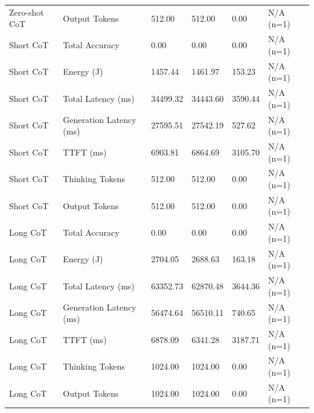 \begin{table}
\begin{tabular}{llllll}
Zero-shot CoT & Output Tokens & 512.00 & 512.00 & 0.00 & N/A (n=1) \\
Short CoT & Total Accuracy & 0.00 & 0.00 & 0.00 & N/A (n=1) \\
Short CoT & Energy (J) & 1457.44 & 1461.97 & 153.23 & N/A (n=1) \\
Short CoT & Total Latency (ms) & 34499.32 & 34443.60 & 3590.44 & N/A (n=1) \\
Short CoT & Generation Latency (ms) & 27595.51 & 27542.19 & 527.62 & N/A (n=1) \\
Short CoT & TTFT (ms) & 6903.81 & 6864.69 & 3105.70 & N/A (n=1) \\
Short CoT & Thinking Tokens & 512.00 & 512.00 & 0.00 & N/A (n=1) \\
Short CoT & Output Tokens & 512.00 & 512.00 & 0.00 & N/A (n=1) \\
Long CoT & Total Accuracy & 0.00 & 0.00 & 0.00 & N/A (n=1) \\
Long CoT & Energy (J) & 2704.05 & 2688.63 & 163.18 & N/A (n=1) \\
Long CoT & Total Latency (ms) & 63352.73 & 62870.48 & 3644.36 & N/A (n=1) \\
Long CoT & Generation Latency (ms) & 56474.64 & 56510.11 & 740.65 & N/A (n=1) \\
Long CoT & TTFT (ms) & 6878.09 & 6341.28 & 3187.71 & N/A (n=1) \\
Long CoT & Thinking Tokens & 1024.00 & 1024.00 & 0.00 & N/A (n=1) \\
Long CoT & Output Tokens & 1024.00 & 1024.00 & 0.00 & N/A (n=1) \\
\bottomrule
\end{tabular}
\end{table}
